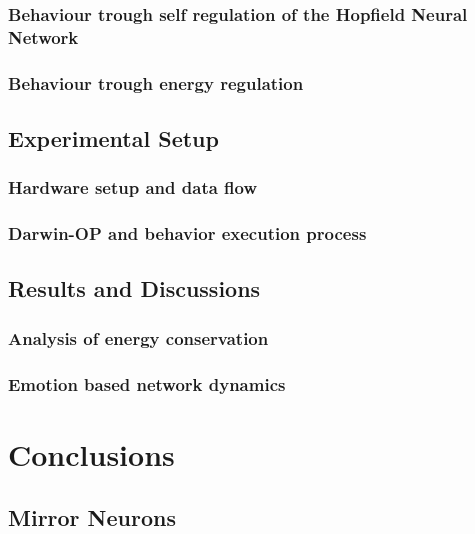 \documentclass[a4,12pt]{ozu-thesis}
\begin{document}
\subsection{Behaviour trough self regulation of the Hopfield Neural Network}

\subsection{Behaviour trough energy regulation}


\section{Experimental Setup}

\subsection{Hardware setup and data flow}

\subsection{Darwin-OP and behavior execution process}


\section{Results and Discussions}

\subsection{Analysis of energy conservation}

\subsection{Emotion based network dynamics}



\chapter{Conclusions}



\section{Mirror Neurons}

\end{document}
